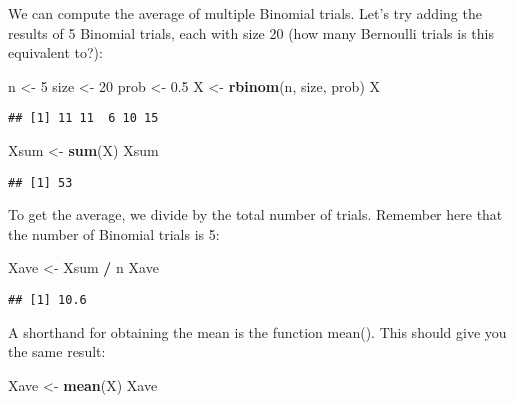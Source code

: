 \documentclass[
]{book}
\newenvironment{Shaded}{\begin{snugshade}}{\end{snugshade}}
\newcommand{\DecValTok}[1]{\textcolor[rgb]{0.00,0.00,0.81}{#1}}
\newcommand{\FloatTok}[1]{\textcolor[rgb]{0.00,0.00,0.81}{#1}}
\newcommand{\KeywordTok}[1]{\textcolor[rgb]{0.13,0.29,0.53}{\textbf{#1}}}
\newcommand{\NormalTok}[1]{#1}
\newcommand{\OperatorTok}[1]{\textcolor[rgb]{0.81,0.36,0.00}{\textbf{#1}}}
\newcommand{\StringTok}[1]{\textcolor[rgb]{0.31,0.60,0.02}{#1}}
\begin{document}
We can compute the average of multiple Binomial trials. Let's try adding the results of 5 Binomial trials, each with size 20 (how many Bernoulli trials is this equivalent to?):

\begin{Shaded}
\begin{Highlighting}[]
\NormalTok{n \textless{}{-}}\StringTok{ }\DecValTok{5}
\NormalTok{size \textless{}{-}}\StringTok{ }\DecValTok{20}
\NormalTok{prob \textless{}{-}}\StringTok{ }\FloatTok{0.5}
\NormalTok{X \textless{}{-}}\StringTok{ }\KeywordTok{rbinom}\NormalTok{(n, size, prob)}
\NormalTok{X}
\end{Highlighting}
\end{Shaded}

\begin{verbatim}
## [1] 11 11  6 10 15
\end{verbatim}

\begin{Shaded}
\begin{Highlighting}[]
\NormalTok{Xsum \textless{}{-}}\StringTok{ }\KeywordTok{sum}\NormalTok{(X)}
\NormalTok{Xsum}
\end{Highlighting}
\end{Shaded}

\begin{verbatim}
## [1] 53
\end{verbatim}

To get the average, we divide by the total number of trials. Remember here that the number of Binomial trials is 5:

\begin{Shaded}
\begin{Highlighting}[]
\NormalTok{Xave \textless{}{-}}\StringTok{ }\NormalTok{Xsum }\OperatorTok{/}\StringTok{ }\NormalTok{n}
\NormalTok{Xave}
\end{Highlighting}
\end{Shaded}

\begin{verbatim}
## [1] 10.6
\end{verbatim}

A shorthand for obtaining the mean is the function mean(). This should give you the same result:

\begin{Shaded}
\begin{Highlighting}[]
\NormalTok{Xave \textless{}{-}}\StringTok{ }\KeywordTok{mean}\NormalTok{(X)}
\NormalTok{Xave}
\end{Highlighting}
\end{Shaded}
\end{document}
